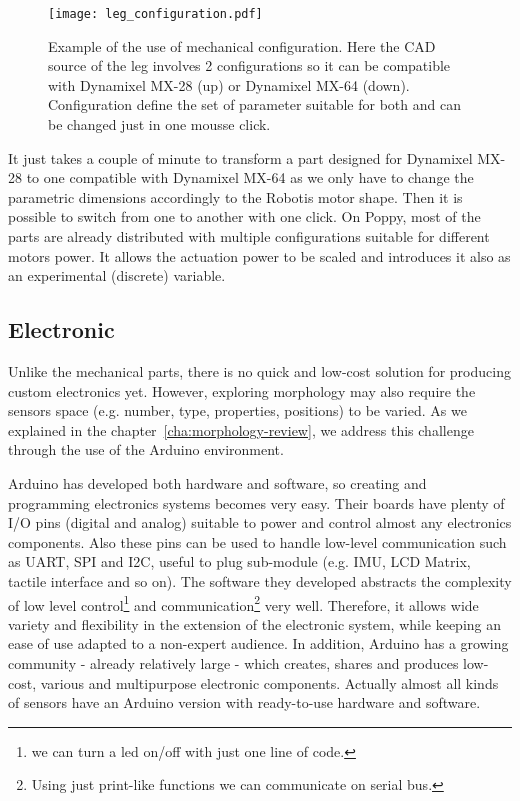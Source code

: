 \begin{figure}[p]
    \centering
        \texttt{[image: leg\_configuration.pdf]}
    \caption{Example of the use of mechanical configuration. Here the CAD source of the leg involves 2 configurations so it can be compatible with Dynamixel MX-28 (up) or Dynamixel MX-64 (down). Configuration define the set of parameter suitable for both and can be changed just in one mousse click.}
    \label{fig:leg_configuration}
\end{figure}

It just takes a couple of minute to transform a part designed for Dynamixel MX-28 to one compatible with Dynamixel MX-64 as we only have to change the parametric dimensions accordingly to the Robotis motor shape. Then it is possible to switch from one to another with one click.
On Poppy, most of the parts are already distributed with multiple configurations suitable for different motors power. It allows the actuation power to be scaled and introduces it also as an experimental (discrete) variable.


\subsection{Electronic} %

Unlike the mechanical parts, there is no quick and low-cost solution for producing custom electronics yet.
However, exploring morphology may also require the sensors space (e.g. number, type, properties, positions) to be varied. As we explained in the chapter~\ref{cha:morphology-review}, we address this challenge through the use of the Arduino environment.

Arduino has developed both hardware and software, so creating and programming electronics systems becomes very easy. Their boards have plenty of I/O pins (digital and analog) suitable to power and control almost any electronics components. Also these pins can be used to handle low-level communication such as UART, SPI and I2C, useful to plug sub-module (e.g. IMU, LCD Matrix, tactile interface and so on).
The software they developed abstracts the complexity of low level control\footnote{we can turn a led on/off with just one line of code.} and communication\footnote{Using just print-like functions we can communicate on serial bus.} very well. Therefore, it allows wide variety and flexibility in the extension of the electronic system, while keeping an ease of use adapted to a non-expert audience.
In addition, Arduino has a growing community - already relatively large - which creates, shares and produces low-cost, various and multipurpose electronic components. Actually almost all kinds of sensors have an Arduino version with ready-to-use hardware and software.

